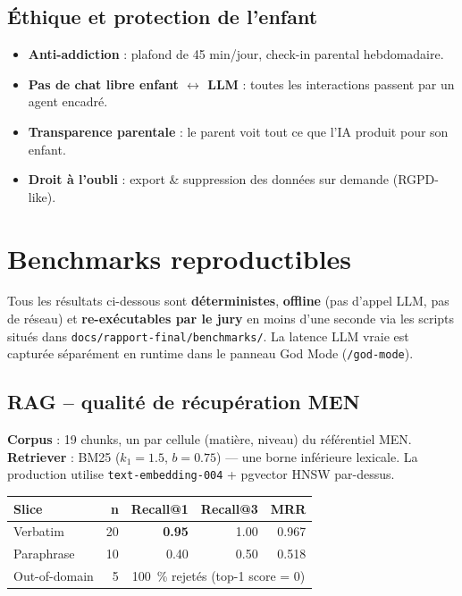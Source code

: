\documentclass[11pt,a4paper]{article}
\begin{document}
\subsection{Éthique et protection de l'enfant}

\begin{itemize}
\item \textbf{Anti-addiction} : plafond de 45 min/jour, check-in parental hebdomadaire.
\item \textbf{Pas de chat libre enfant $\leftrightarrow$ LLM} : toutes les interactions passent par un agent encadré.
\item \textbf{Transparence parentale} : le parent voit tout ce que l'IA produit pour son enfant.
\item \textbf{Droit à l'oubli} : export \& suppression des données sur demande (RGPD-like).
\end{itemize}

\newpage

\section{Benchmarks reproductibles}
\label{sec:benchmarks}

Tous les résultats ci-dessous sont \textbf{déterministes}, \textbf{offline}
(pas d'appel LLM, pas de réseau) et \textbf{re-exécutables par le jury} en
moins d'une seconde via les scripts situés dans
\texttt{docs/rapport-final/benchmarks/}. La latence LLM vraie est capturée
séparément en runtime dans le panneau God Mode (\texttt{/god-mode}).

\subsection{RAG -- qualité de récupération MEN}

\textbf{Corpus} : 19 chunks, un par cellule (matière, niveau) du référentiel
MEN. \textbf{Retriever} : BM25 ($k_1{=}1.5$, $b{=}0.75$) --- une borne
inférieure lexicale. La production utilise \texttt{text-embedding-004} +
pgvector HNSW par-dessus.

\begin{center}
\small
\begin{tabular}{@{}lrrrr@{}}
\toprule
\textbf{Slice}         & \textbf{n} & \textbf{Recall@1} & \textbf{Recall@3} & \textbf{MRR} \\
\midrule
Verbatim               & 20 & \textbf{0.95} & 1.00 & 0.967 \\
Paraphrase             & 10 & 0.40          & 0.50 & 0.518 \\
Out-of-domain          &  5 & \multicolumn{3}{c}{\textcolor{ok}{100~\% rejetés (top-1 score = 0)}} \\
\bottomrule
\end{tabular}
\end{center}
\end{document}

